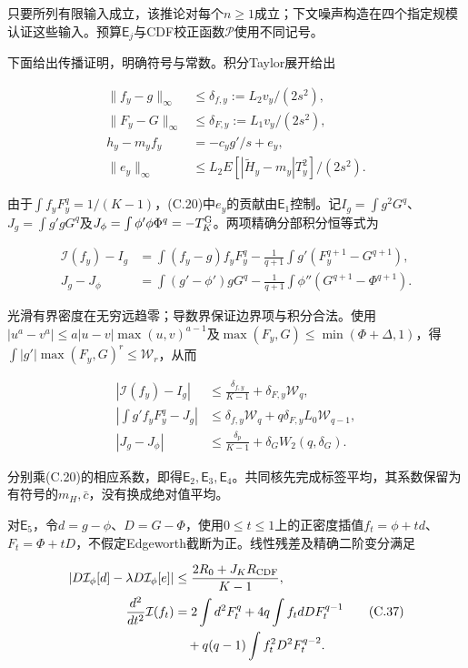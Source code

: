 \documentclass[11pt,a4paper]{article}
\begin{document}
只要所列有限输入成立，该推论对每个\(n\ge1\)成立；下文噪声构造在四个指定规模认证这些输入。预算\(\mathsf E_j\)与CDF校正函数\(\mathcal P\)使用不同记号。

下面给出传播证明，明确符号与常数。积分Taylor展开给出

\[
\begin{aligned}
\|f_y-g\|_\infty&\le\delta_{f,y}:=L_2v_y/(2s^2),\\
\|F_y-G\|_\infty&\le\delta_{F,y}:=L_1v_y/(2s^2),\\
h_y-m_yf_y&=-c_yg'/s+e_y,\\
\|e_y\|_\infty&\le L_2E[|\widetilde H_y-m_y|T_y^2]/(2s^2).
\end{aligned}
\tag{C.34}
\]

由于\(\int f_yF_y^q=1/(K-1)\)，(C.20)中\(e_y\)的贡献由\(\mathsf E_1\)控制。记\(I_g=\int g^2G^q\)、\(J_g=\int g'gG^q\)及\(J_\phi=\int\phi'\phi\Phi^q=-T_K^{\rm G}\)。两项精确分部积分恒等式为

\[
\begin{aligned}
\mathcal I(f_y)-I_g
&=\int(f_y-g)f_yF_y^q
-\frac1{q+1}\int g'(F_y^{q+1}-G^{q+1}),\\
J_g-J_\phi
&=\int(g'-\phi')gG^q
-\frac1{q+1}\int\phi''(G^{q+1}-\Phi^{q+1}).
\end{aligned}
\tag{C.35}
\]

光滑有界密度在无穷远趋零；导数界保证边界项与积分合法。使用\(|u^a-v^a|\le a|u-v|\max(u,v)^{a-1}\)及\(\max(F_y,G)\le\min(\Phi+\Delta,1)\)，得\(\int|g'|\max(F_y,G)^r\le\mathcal W_r\)，从而

\[
\begin{aligned}
|\mathcal I(f_y)-I_g|&\le\frac{\delta_{f,y}}{K-1}+\delta_{F,y}\mathcal W_q,\\
\left|\int g'f_yF_y^q-J_g\right|
&\le\delta_{f,y}\mathcal W_q+q\delta_{F,y}L_0\mathcal W_{q-1},\\
|J_g-J_\phi|&\le\frac{\delta_p}{K-1}+\delta_GW_2(q,\delta_G).
\end{aligned}
\tag{C.36}
\]

分别乘(C.20)的相应系数，即得\(\mathsf E_2,\mathsf E_3,\mathsf E_4\)。共同核先完成标签平均，其系数保留为有符号的\(m_H,\bar c\)，没有换成绝对值平均。

对\(\mathsf E_5\)，令\(d=g-\phi\)、\(D=G-\Phi\)，使用\(0\le t\le1\)上的正密度插值\(f_t=\phi+td\)、\(F_t=\Phi+tD\)，不假定Edgeworth截断为正。线性残差及精确二阶变分满足

\[
\begin{aligned}
|D\mathcal I_\phi[d]-\lambda D\mathcal I_\phi[e]|
&\le\frac{2R_0+J_KR_{\rm CDF}}{K-1},\\
\frac{d^2}{dt^2}\mathcal I(f_t)
&=2\int d^2F_t^q+4q\int f_tdDF_t^{q-1}\\
&\quad+q(q-1)\int f_t^2D^2F_t^{q-2}.
\end{aligned}
\tag{C.37}
\]
\end{document}
